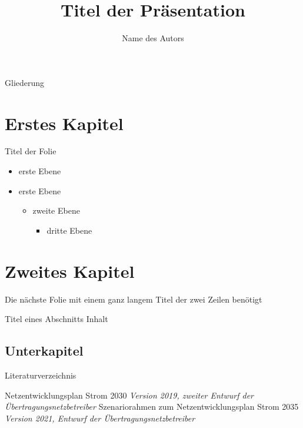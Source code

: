 \documentclass[aspectratio=43]{beamer}
\begin{document}
\author{Name des Autors}
\title{Titel der Präsentation}

\maketitle

\begin{frame}{Gliederung}
\tableofcontents
\end{frame}

\section{Erstes Kapitel}
\begin{frame}{Titel der Folie}

      	\begin{itemize}
      		\item erste Ebene
      		\item erste Ebene
      		\begin{itemize}
      			\item zweite Ebene
      			   \begin{itemize}
      					\item dritte Ebene
      				\end{itemize}
      		\end{itemize}
      		
      	\end{itemize}
\end{frame}

\section{Zweites Kapitel}
\begin{frame}{Die nächste Folie mit einem ganz langem Titel der zwei Zeilen benötigt}

	\begin{block}{Titel eines Abschnitts}
	Inhalt
	\end{block}
\end{frame}
\subsection{Unterkapitel}


\begin{frame}{Literaturverzeichnis}
\begin{thebibliography}{11}

 Netzentwicklungsplan Strom 2030
	\newblock \emph{Version 2019, zweiter Entwurf der Übertragungsnetzbetreiber}
 Szenariorahmen zum Netzentwicklungsplan Strom 2035
	\newblock \emph{Version 2021, Entwurf der Übertragungsnetzbetreiber}

\end{thebibliography}
\end{frame}
\end{document}

